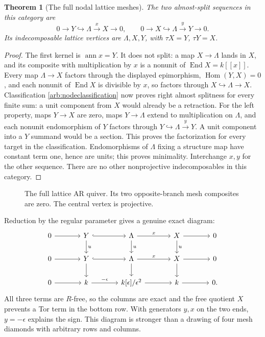 \documentclass[11pt,oneside,openany]{book}
\newtheorem{theorem}{Theorem}[chapter]
\theoremstyle{definition}\newtheorem{definition}[theorem]{Definition}
\theoremstyle{remark}\newtheorem{remark}[theorem]{Remark}
\begin{document}
\begin{theorem}[The full nodal lattice meshes]\label{arb:nodear}
The two almost-split sequences in this category are
\[
 0\to Y\hookrightarrow\Lambda\xrightarrow{x}X\to0,
 \qquad0\to X\hookrightarrow\Lambda\xrightarrow{y}Y\to0.
\]
Its indecomposable lattice vertices are $\Lambda,X,Y$, with $\tau X=Y$, $\tau Y=X$.
\end{theorem}
\begin{proof}
The first kernel is $\operatorname{ann}x=Y$. It does not split: a map
$X\to\Lambda$ lands in $X$, and its composite with multiplication by $x$
is a nonunit of $\operatorname{End}X=k[[x]]$. Every map $\Lambda\to X$
factors through the displayed epimorphism, $\operatorname{Hom}(Y,X)=0$,
and each nonunit of $\operatorname{End}X$ is divisible by $x$, so factors
through $X\hookrightarrow\Lambda\to X$. Classification
\eqref{arb:nodeclassification} now proves right almost splitness for every
finite sum: a unit component from $X$ would already be a retraction.
For the left property, maps $Y\to X$ are zero, maps $Y\to\Lambda$
extend to multiplication on $\Lambda$, and each nonunit endomorphism of
$Y$ factors through $Y\hookrightarrow\Lambda\xrightarrow{y}Y$.
A unit component into a $Y$ summand would be a section. This proves the
factorization for every target in the classification. Endomorphisms of
$\Lambda$ fixing a structure map have constant term one, hence are units;
this proves minimality.
Interchange $x,y$ for the other sequence. There are no other nonprojective
indecomposables in this category.
\end{proof}

\begin{figure}[htbp]\centering
{}
\caption{The full lattice AR quiver. Its two opposite-branch mesh composites
are zero. The central vertex is projective.}
\end{figure}

Reduction by the regular parameter gives a genuine exact diagram:
\[
\begin{tikzcd}[column sep=large]
0\arrow[r]&Y\arrow[r,hook]\arrow[d,"u"]&\Lambda\arrow[r,"x"]\arrow[d,"u"]&X\arrow[r]\arrow[d,"u"]&0\\
0\arrow[r]&Y\arrow[r,hook]\arrow[d]&\Lambda\arrow[r,"x"]\arrow[d]&X\arrow[r]\arrow[d]&0\\
0\arrow[r]&k\arrow[r,"-\epsilon"]&k[\epsilon]/\epsilon^2\arrow[r]&k\arrow[r]&0 .
\end{tikzcd}
\]
All three terms are $R$-free, so the columns are exact and the free quotient
$X$ prevents a Tor term in the bottom row. With generators $y,x$ on the two
ends, $y=-\epsilon$ explains the sign. This diagram is stronger than a drawing
of four mesh diamonds with arbitrary rows and columns.
\end{document}
